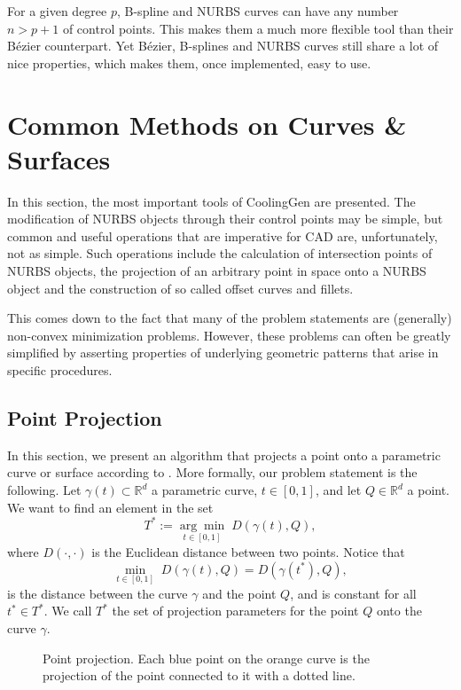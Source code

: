 \documentclass[a4paper, 11pt]{report}
\theoremstyle{definition}
\begin{document}
	For a given degree $p$, B-spline and NURBS curves can have any number $n > p+1$ of control points. This makes them a much more flexible tool than their Bézier counterpart. Yet Bézier, B-splines and NURBS curves still share a lot of nice properties, which makes them, once implemented, easy to use.

\section{Common Methods on Curves \& Surfaces}
	In this section, the most important tools of CoolingGen are presented. The modification of NURBS objects through their control points may be simple, but common and useful operations that are imperative for CAD are, unfortunately, not as simple. Such operations include the calculation of intersection points of NURBS objects, the projection of an arbitrary point in space onto a NURBS object and the construction of so called offset curves and fillets.

	This comes down to the fact that many of the problem statements are (generally) non-convex minimization problems. However, these problems can often be greatly simplified by asserting properties of underlying geometric patterns that arise in specific procedures.

\subsection{Point Projection}\label{subsec:pointproj}
	In this section, we present an algorithm that projects a point onto a parametric curve or surface according to \cite{Piegl1997}. More formally, our problem statement is the following. Let $\gamma(t) \subset \mathbb{R}^d$ a parametric curve, $t \in [0,1]$, and let $Q \in \mathbb{R}^d$ a point. We want to find an element in the set
		$$T^* := \underset{t\in[0,1]}{\arg\min} \; D(\gamma(t), Q), $$
	where $D(\cdot, \cdot)$ is the Euclidean distance between two points. Notice that 
		$$\underset{t\in[0,1]}{\min} \; D(\gamma(t), Q) = D(\gamma(t^*), Q), $$
	is the distance between the curve $\gamma$ and the point $Q$, and is constant for all $t^* \in T^*$. We call $T^*$ the set of projection parameters for the point $Q$ onto the curve $\gamma$.

	\begin{figure}[H]
		\centering
		
		\caption{Point projection. Each blue point on the orange curve is the projection of the point connected to it with a dotted line.}
		\label{fig:pointinversion}
	\end{figure}
\end{document}
